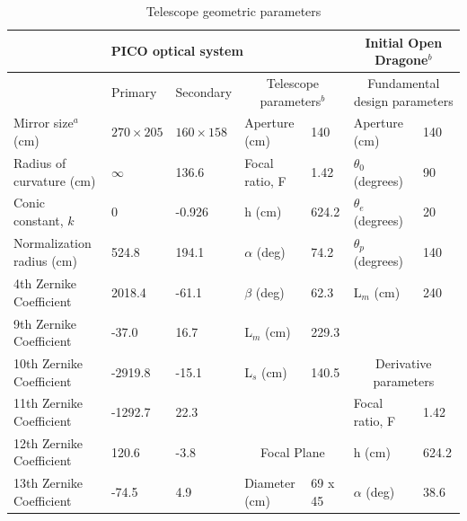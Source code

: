 \documentclass[]{spie}  %
\begin{document}
\begin{table}[ht]
\centering
\caption{Telescope geometric parameters  \label{tab:optics}}

\begin{adjustbox}{width=1.05\textwidth}
\hspace{-1cm}
\begin{tabular}{|l|llll||ll|}
\hline
\multicolumn{5}{|c||}{PICO optical system}                                    & \multicolumn{2}{c|}{Initial Open Dragone$^b$}     \\ \hline
                          & Primary           & Secondary    & \multicolumn{2}{c||}{Telescope parameters$^b$} & \multicolumn{2}{c|}{Fundamental design parameters}  \\
Mirror size$^a$ (cm)      & $270 \times 205$ & $160 \times 158$ & Aperture (cm)           & 140      & Aperture (cm)                  & 140   \\
Radius of curvature (cm)  & $\infty$         & 136.6             & Focal ratio, F             & 1.42     & $\theta_0$ (degrees)           & 90    \\
Conic constant, $k$       & 0                 & -0.926            & h (cm)                    & 624.2    & $\theta_e$ (degrees)           & 20    \\
Normalization radius (cm) & 524.8             & 194.1             & $\alpha$ (deg)            & 74.2     & $\theta_p$ (degrees)           & 140   \\
4th Zernike Coefficient   & 2018.4            & -61.1             & $\beta$  (deg)            &  62.3    & L$_m$ (cm)                     & 240   \\
9th Zernike Coefficient   & -37.0             & 16.7              & L$_m$ (cm)                &   229.3  &                                &         \\
10th Zernike Coefficient  & -2919.8           & -15.1             & L$_s$ (cm)                &   140.5  & \multicolumn{2}{c|}{Derivative parameters} \\ 
11th Zernike Coefficient  & -1292.7           & 22.3              &                           &          & Focal ratio, F                 & 1.42  \\   
12th Zernike Coefficient  & 120.6             & -3.8              &   \multicolumn{2}{c||}{Focal Plane}  & h (cm)                         & 624.2 \\   
13th Zernike Coefficient  & -74.5             & 4.9               & Diameter (cm)             & 69 x 45  & $\alpha$ (deg)                 & 38.6  \\   

\end{tabular}
\end{adjustbox}
\end{table}
\end{document}
